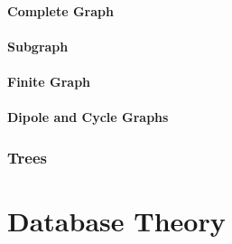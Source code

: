 \documentclass{article}
\begin{document}
\subsection{Complete Graph} \label{subsec:complete_graph}

\subsection{Subgraph} \label{subsec:subgraphs}

\subsection{Finite Graph} \label{subsec:finite_graph}

\subsection{Dipole and Cycle Graphs} \label{subsec:dipole_cycle_graph}

\section{Trees} \label{sec:trees}




\part{Database Theory}\label{sec:database_theory}

\end{document}
